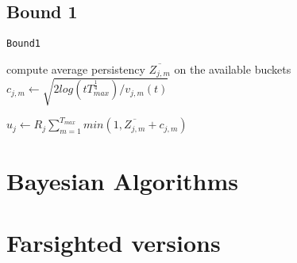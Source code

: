 \subsection{Bound 1}

\begin{algorithm}[!h]
	\caption{\texttt{Bound1}}
	\begin{scriptsize}
		\begin{algorithmic}[1]
			
			
			
			
			
			\State compute average persistency $\overline{Z_{j,m}}$ on the available buckets \;
			\State$c_{j,m}\gets  \sqrt{{2log(tT_{max}^{\frac{1}{4}})}/{v_{j,m}(t)}}$\;
			
			\EndFor		
			
			\State $u_j \gets  R_j \sum_{m=1}^{T_{max}} min(1,\overline{Z_{j,m}}+c_{j,m}) $\;	
			\EndFor
			
			
			
			
			\EndFunction
			
		\end{algorithmic}
	\end{scriptsize}
	\label{alg:Bound1}
\end{algorithm}







\section{Bayesian Algorithms}

\section{Farsighted versions}

